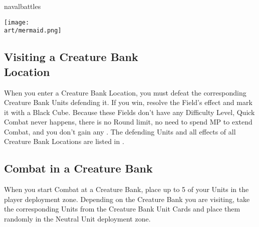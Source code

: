 \begin{expansion}[before=\vspace*{-11mm}]{navalbattles}
\begin{multicols*}{2}
  \begin{center}
    \texttt{[image: \\art/mermaid.png]}
  \end{center}
  \columnbreak

  \subsection*{Visiting a Creature Bank\\Location}
  When you enter a Creature Bank Location, you must defeat the corresponding Creature Bank Units defending it.
  If you win, resolve the Field's effect and mark it with a Black Cube.
  Because these Fields don't have any Difficulty Level, Quick Combat never happens, there is no Round limit, no need to spend MP to extend Combat, and you don't gain any .
  The defending Units and all effects of all Creature Bank Locations are listed in .

  \subsection*{Combat in a Creature Bank}
  When you start Combat at a Creature Bank, place up to 5 of your Units in the player deployment zone.
  Depending on the Creature Bank you are visiting, take the corresponding Units from the Creature Bank Unit Cards and place them randomly in the Neutral Unit deployment zone.

  \bigskip
  \begin{center}
  \end{center}
  \bigskip


\end{multicols*}
\end{expansion}

